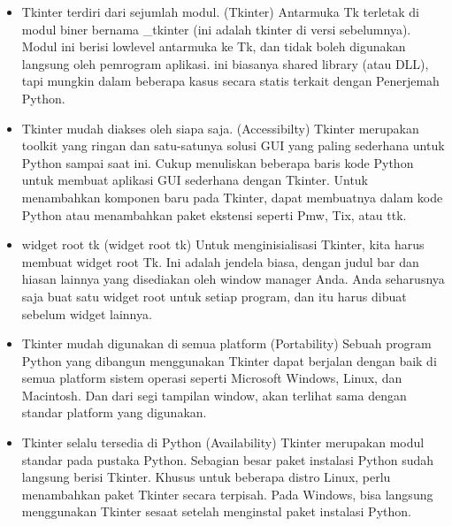 \documentclass [12pt,a4paper,notitlepage,oneside,bahasa]{article}
\begin{document}
\begin{enumerate}
\begin{itemize}
\noindent 
\begin{itemize}
\item 
Tkinter terdiri dari sejumlah modul.  (Tkinter)\vspace{\baselineskip}
Antarmuka Tk terletak di modul biner
bernama _tkinter (ini adalah tkinter di versi sebelumnya). Modul ini berisi lowlevel
antarmuka ke Tk, dan tidak boleh digunakan langsung oleh pemrogram aplikasi. ini
biasanya shared library (atau DLL), tapi mungkin dalam beberapa kasus secara statis terkait dengan
Penerjemah Python. \par
\noindent
\item Tkinter mudah diakses oleh siapa saja. (Accessibilty)\vspace{\baselineskip}
Tkinter merupakan toolkit yang ringan dan satu-satunya solusi GUI yang paling sederhana untuk Python sampai saat ini. Cukup menuliskan 
beberapa baris kode Python untuk membuat aplikasi GUI sederhana dengan Tkinter. Untuk menambahkan komponen baru pada Tkinter, dapat 
membuatnya dalam kode Python atau menambahkan paket ekstensi seperti Pmw, Tix, atau ttk. \par
\noindent 
\item widget root tk (widget root tk)\vspace{\baselineskip}
Untuk menginisialisasi Tkinter, kita harus membuat widget root Tk. Ini adalah jendela biasa, dengan
judul bar dan hiasan lainnya yang disediakan oleh window manager Anda. Anda seharusnya saja
buat satu widget root untuk setiap program, dan itu harus dibuat sebelum widget lainnya. \par
\noindent 
\item Tkinter mudah digunakan di semua platform (Portability)\vspace{\baselineskip}
Sebuah program Python yang dibangun menggunakan Tkinter dapat berjalan dengan baik di semua platform sistem operasi seperti Microsoft 
Windows, Linux, dan Macintosh. Dan dari segi tampilan window, akan terlihat sama dengan standar platform yang digunakan. \par
\noindent 
\item Tkinter selalu tersedia di Python (Availability)\vspace{\baselineskip}
Tkinter merupakan modul standar pada pustaka Python. Sebagian besar paket instalasi Python sudah langsung berisi Tkinter. Khusus untuk 
beberapa distro Linux, perlu menambahkan paket Tkinter secara terpisah. Pada Windows, bisa langsung menggunakan Tkinter sesaat setelah 
menginstal paket instalasi Python. \par

\end{itemize}
\end{itemize}
\end{enumerate}
\end{document}
